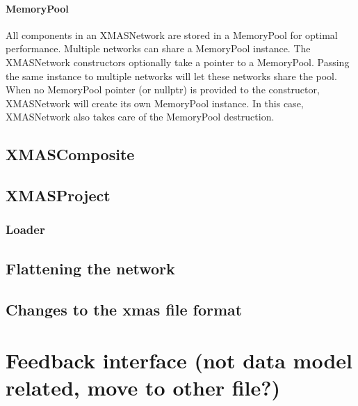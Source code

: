 \paragraph{MemoryPool}
All components in an XMASNetwork are stored in a MemoryPool for optimal performance.
Multiple networks can share a MemoryPool instance. The XMASNetwork constructors
optionally take a pointer to a MemoryPool. Passing the same instance to multiple
networks will let these networks share the pool. When no MemoryPool pointer (or
nullptr) is provided to the constructor, XMASNetwork will create its own
MemoryPool instance. In this case, XMASNetwork also takes care of the MemoryPool
destruction.

\subsection{XMASComposite}

\subsection{XMASProject}

\subsubsection{Loader}

\subsection{Flattening the network}

\subsection{Changes to the xmas file format}

\section{Feedback interface (not data model related, move to other file?)}

\newpage

